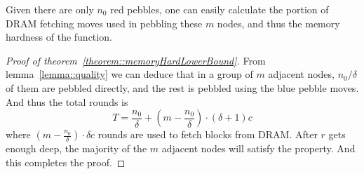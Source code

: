 Given there are only $n_0$ red pebbles, one can easily calculate the portion of DRAM fetching moves used in pebbling
these $m$ nodes, and thus the memory hardness of the function.

\begin{proof}[Proof of theorem~\ref{theorem::memoryHardLowerBound}]
  From lemma~\ref{lemma::quality} we can deduce that in a group of $m$ adjacent nodes, $n_0 / \delta$ of them are pebbled
  directly, and the rest is pebbled using the blue pebble moves. And thus the total rounds is
  \begin{equation}
    T = \frac{n_0}{\delta} + (m - \frac{n_0}{\delta}) \cdot (\delta + 1) c
  \end{equation}
  where $(m - \frac{n_0}{\delta}) \cdot \delta c$ rounds are used to fetch blocks from DRAM. After $r$ gets enough deep,
  the majority of the $m$ adjacent nodes will satisfy the property. And this completes the proof.
\end{proof}